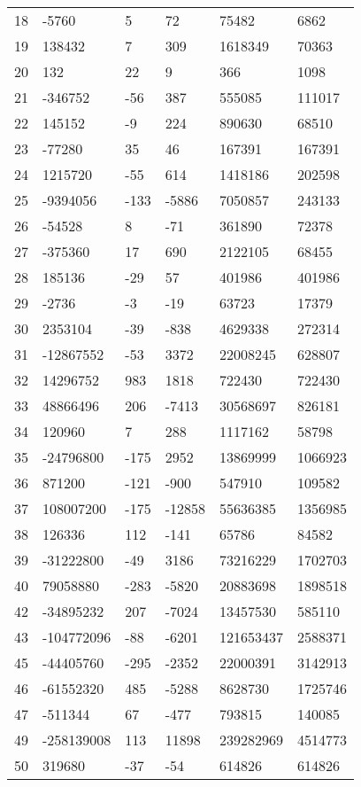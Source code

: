 \documentclass{amsart}
\begin{document}
\begin{longtable}{llllll}
18 & -5760 & 5 & 72 & 75482 & 6862\\
19 & 138432 & 7 & 309 & 1618349 & 70363\\
20 & 132 & 22 & 9 & 366 & 1098\\
21 & -346752 & -56 & 387 & 555085 & 111017\\
22 & 145152 & -9 & 224 & 890630 & 68510\\
23 & -77280 & 35 & 46 & 167391 & 167391\\
24 & 1215720 & -55 & 614 & 1418186 & 202598\\
25 & -9394056 & -133 & -5886 & 7050857 & 243133\\
26 & -54528 & 8 & -71 & 361890 & 72378\\
27 & -375360 & 17 & 690 & 2122105 & 68455\\
28 & 185136 & -29 & 57 & 401986 & 401986\\
29 & -2736 & -3 & -19 & 63723 & 17379\\
30 & 2353104 & -39 & -838 & 4629338 & 272314\\
31 & -12867552 & -53 & 3372 & 22008245 & 628807\\
32 & 14296752 & 983 & 1818 & 722430 & 722430\\
33 & 48866496 & 206 & -7413 & 30568697 & 826181\\
34 & 120960 & 7 & 288 & 1117162 & 58798\\
35 & -24796800 & -175 & 2952 & 13869999 & 1066923\\
36 & 871200 & -121 & -900 & 547910 & 109582\\
37 & 108007200 & -175 & -12858 & 55636385 & 1356985\\
38 & 126336 & 112 & -141 & 65786 & 84582\\
39 & -31222800 & -49 & 3186 & 73216229 & 1702703\\
40 & 79058880 & -283 & -5820 & 20883698 & 1898518\\
42 & -34895232 & 207 & -7024 & 13457530 & 585110\\
43 & -104772096 & -88 & -6201 & 121653437 & 2588371\\
45 & -44405760 & -295 & -2352 & 22000391 & 3142913\\
46 & -61552320 & 485 & -5288 & 8628730 & 1725746\\
47 & -511344 & 67 & -477 & 793815 & 140085\\
49 & -258139008 & 113 & 11898 & 239282969 & 4514773\\
50 & 319680 & -37 & -54 & 614826 & 614826\\
\hline
\end{longtable}
\end{document}
